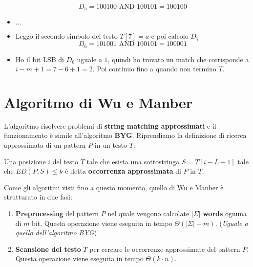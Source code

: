 \begin{esempio}
\begin{itemize}
              \begin{equation}
                  D_5 = 100100 \text{ AND } 100101 = 100100
              \end{equation}
        \item $\dots$
        \item Leggo il secondo simbolo del testo $T[7] = a$ e poi calcolo $D_7$
              \begin{equation}
                  D_6 = 101001 \text{ AND } 100101 = 100001
              \end{equation}
        \item Ho il bit LSB di $D_6$ uguale a $1$, quindi ho trovato un match che
              corrisponde a $i - m + 1 = 7 - 6 + 1 = 2$. Poi continuo fino a
              quando non termino $T$.
    \end{itemize}
\end{esempio}
\section{Algoritmo di Wu e Manber}
L'algoritmo risolvere problemi di \textbf{string matching approssimati} e il
funzionamento è simile all'algoritmo \textbf{BYG}.
Riprendiamo la definizione di ricerca approssimata di un pattern $P$ in un testo
$T$:
\begin{definizione}
    Una posizione $i$ del testo $T$ tale che esista una sottostringa $S = T[i -
                L + 1]$ tale che $ED(P, S) \leq k$ è detta \textbf{occorrenza
        approssimata} di $P$ in $T$.
\end{definizione}
Come gli algoritmi visti fino a questo momento, quello di Wu e Manber è
strutturato in due fasi:
\begin{enumerate}
    \item \textbf{Preprocessing} del pattern $P$ nel quale vengono calcolate
          $|\Sigma|$ \textbf{words} ognuna di $m$ bit. Questa operazione viene
          eseguita in tempo $\Theta(|\Sigma| + m)$. (\textit{Uguale a quello
              dell'algoritmo BYG})
    \item \textbf{Scansione del testo} $T$ per cercare le occorrenze approssimate
          del pattern $P$. Questa operazione viene eseguita in tempo
          $\Theta(k \cdot n)$.
\end{enumerate}
